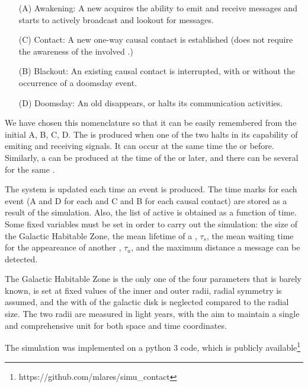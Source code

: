\begin{enumerate}
   \item[(A)] Awakening: A new \ceti{} acquires the ability to emit
      and receive messages and starts to actively broadcast and
      lookout for messages.
   \item[(C)] Contact: A new one-way causal contact is established
      (does not require the awareness of the involved \cetis{}.)
   \item[(B)] Blackout: An existing causal contact is interrupted,
      with or without the occurrence of a doomsday event.
   \item[(D)] Doomsday: An old \ceti{} disappears, or halts its
      communication activities.
\end{enumerate}

We have chosen this nomenclature so that it can be easily remembered
from the initial A, B, C, D.
%
The \blackout is produced when one of the two \cetis{} halts in its
capability of emiting and receiving signals.
%
It can occur at the same time the \doomsday or before.
%
Similarly, a \ccontact can be produced at the time of the \aawakening
or later, and there can be several \contacts for the same \ceti{}.

                        

The system is updated each time an event is produced.
%
The time marks for each event (A and D for each \ceti{} and C and B for
each causal contact) are stored as a result of the simulation.
%
Also, the list of active \cetis{} is obtained as a function of time.
%
Some fixed variables must be set in order to carry out the simulation:
the size of the Galactic Habitable Zone, the mean lifetime of a
\ceti{},
$\tau_s$, the mean waiting time for the appeareance of another \ceti{},
$\tau_a$, and the maximum distance a message can be detected.



The Galactic Habitable Zone is the only one of the four parameters
that is barely known, is set at fixed values of the inner and outer
radii, radial symmetry is assumed, and the with of the galactic disk is
neglected compared to the radial size.
%
The two radii are measured in light years, with the aim to maintain a
single and comprehensive unit for both space and time coordinates. 

The simulation was implemented on a python 3 code, which is publicly
available\footnote{https://github.com/mlares/simu\_contact}

